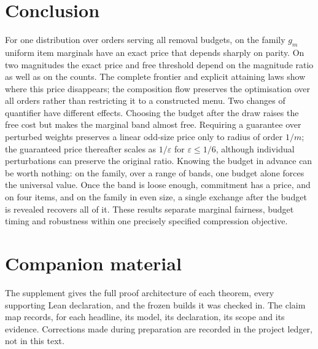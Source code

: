 \documentclass[conference]{IEEEtran}
\theoremstyle{definition}
\begin{document}
\section{Conclusion}

For one distribution over orders serving all removal budgets, on the family $g_m$ uniform item
marginals have an exact price that depends sharply on parity. On two magnitudes the exact price
and free threshold depend on the magnitude ratio as well as on the counts. The complete frontier and explicit attaining
laws show where this price disappears; the composition flow preserves the optimisation over
all orders rather than restricting it to a constructed menu. Two changes of quantifier have
different effects. Choosing the budget after the draw raises the free cost but makes the
marginal band almost free. Requiring a guarantee over perturbed weights preserves a linear
odd-size price only to radius of order $1/m$; the guaranteed price thereafter scales as
$1/\varepsilon$ for $\varepsilon\le1/6$, although individual perturbations can preserve the original ratio.
Knowing the budget in advance can be worth nothing: on the family, over a range of bands, one
budget alone forces the universal value. Once the band is loose enough, commitment has a price,
and on four items, and on the family in even size, a single exchange after the budget is
revealed recovers all of it.
These results separate marginal fairness, budget timing and robustness within one precisely
specified compression objective.

\section*{Companion material}
The supplement gives the full proof architecture of each theorem, every supporting Lean
declaration, and the frozen builds it was checked in. The claim map records, for each
headline, its model, its declaration, its scope and its evidence. Corrections made during
preparation are recorded in the project ledger, not in this text.
\end{document}
